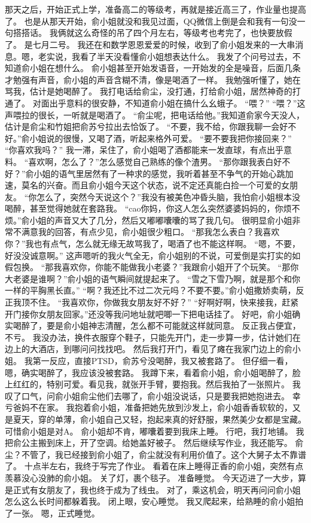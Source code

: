 \chapter{}
那天之后，开始正式上学，准备高二的等级考，再就是接近高三了，作业量也提高了。
也是从那天开始，俞小姐就没和我见过面，QQ微信上倒是会和我有一句没一句搭搭话。
我俩就这么奇怪的吊了四个月左右，等级考也考完了，也快要放假了。
是七月二号。
我还在和数学恩恩爱爱的时候，收到了俞小姐发来的一大串消息。嗯，老实说，我看了半天没看懂俞小姐想表达什么。
我发了个问号过去，不知道俞小姐在想什么。
俞小姐甚至开始发语音，一开始发的全是噪音，后面几条才勉强有声音，俞小姐的声音含糊不清，像是喝酒了一样。 我勉强听懂了，她在骂我，估计是她喝醉了。
我打电话给俞尘，没打通，打给俞小姐，居然神奇的打通了。
对面出乎意料的很安静，不知道俞小姐在搞什么幺蛾子。
“喂？”
“喂？”这声喂拉的很长，一听就是喝酒了。
“俞尘呢，把电话给他。”我知道俞家今天没人，估计是俞尘和竹姐把俞苏兮拉出去恰饭了。
“不要，我不给，你跟我聊一会好不好。”俞小姐说的很慢，又喝了酒，听起来格外可爱。
“要不要我把你接回来？”
“你喜欢我吗？”
我一滞，呆住了，俞小姐喝了酒都能来一发直球，有点出乎意料。
“喜欢啊，怎么了？”怎么感觉自己熟练的像个渣男。
“那你跟我表白好不好？”俞小姐的语气里居然有了一种求的感觉，我听着甚至不争气的开始心跳加速，莫名的兴奋。而且俞小姐今天这个状态，说不定还真能白捡一个可爱的女朋友。
“你怎么了，突然今天说这个？”我没有被美色冲昏头脑，我怕俞小姐根本没喝醉，甚至觉得她就在套路我。
“cao你妈，你这人怎么突然婆婆妈妈的，你烦不烦。”俞小姐的声音又大了几分，然后又嘟嘟囔囔的骂了我几句。
很明显俞小姐非常不满意我的回答，有点少见，俞小姐很少粗口。
“那我怎么表白？我喜欢你？”我也有点气，怎么就无缘无故骂我了，喝酒了也不能这样啊。
“嗯，不要，好没没诚意啊。”
这声嗯听的我火气全无，俞小姐别的不说，可爱倒是实打实的如假包换。
“那我喜欢你，你能不能做我小老婆？”我跟俞小姐开了个玩笑。
“那你大老婆是谁啊？”俞小姐的语气瞬间就提起来了。
“雪之下雪乃啊，就是那个和你一样的平胸黑长直。”
“啊？我还比不过二次元吗？不要不要。”俞小姐撒娇卖萌，反正我顶不住。
“我喜欢你，你做我女朋友好不好？”
“好啊好啊，快来接我，赶紧开门接你女朋友回家。”还没等我问地址就吧唧一下把电话挂了。
好吧，俞小姐确实喝醉了，要是俞小姐神志清醒，怎么都不可能就这样就同意。
反正我占便宜，不亏。
我没办法，换件衣服穿个鞋子，只能先开门，走一步算一步，估计她们在边上的大酒店，到哪问问找找吧。
然后我打开门，看见了瘫在我家门边上的俞小姐。
我第一反应，直接PTSD，俞苏兮没喝醉，我又被套路了。
但仔细一看，嗯，确实喝醉了，我应该没被套路。
我蹲下来，看着俞小姐，俞小姐喝醉了，脸上红红的，特别可爱。看见我，就张开手臂，要抱我。然后我拍了一张照片。
我叹了口气，问俞小姐俞尘他们去哪了，俞小姐没说话，只是要我把她抱进去。
幸亏爸妈不在家。
我抱着俞小姐，准备把她先放到沙发上，俞小姐香香软软的，又是夏天，穿的单薄，俞小姐自己又轻，抱起来真的好舒服，果然美少女都是宝藏。
可惜俞小姐是对A。
俞小姐却不肯，嘟囔着要到我床上睡。
行吧，我打地铺。
我把俞公主搬到床上，开了空调。给她盖好被子。
然后继续写作业，我还能写。
俞尘？不管了，我已经接到俞小姐了，俞尘就没有利用价值了。这个大舅子太不靠谱了。
十点半左右，我终于写完了作业。
看着在床上睡得正香的俞小姐，突然有点羡慕没心没肺的俞小姐。
关了灯，裹个毯子。
准备睡觉。
今天迈进了一大步，算是正式有女朋友了，我也终于成为了线虫。
对了，乘这机会，明天再问问俞小姐怎么这么长时间都躲着我。
闭上眼，安心睡觉。
我又爬起来，给熟睡的俞小姐拍了一张。
嗯，正式睡觉。

